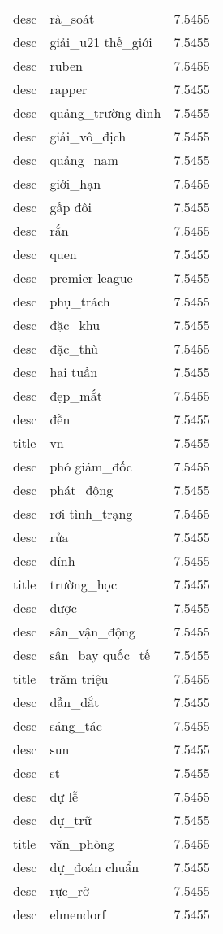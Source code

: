 \documentclass{article}
\begin{document}
\begin{tabular}{lll}
desc & rà\_soát & 7.5455\\
desc & giải\_u21 thế\_giới & 7.5455\\
desc & ruben & 7.5455\\
desc & rapper & 7.5455\\
desc & quảng\_trường đình & 7.5455\\
desc & giải\_vô\_địch & 7.5455\\
desc & quảng\_nam & 7.5455\\
desc & giới\_hạn & 7.5455\\
desc & gấp đôi & 7.5455\\
desc & rắn & 7.5455\\
desc & quen & 7.5455\\
desc & premier league & 7.5455\\
desc & phụ\_trách & 7.5455\\
desc & đặc\_khu & 7.5455\\
desc & đặc\_thù & 7.5455\\
desc & hai tuần & 7.5455\\
desc & đẹp\_mắt & 7.5455\\
desc & đền & 7.5455\\
title & vn & 7.5455\\
desc & phó giám\_đốc & 7.5455\\
desc & phát\_động & 7.5455\\
desc & rơi tình\_trạng & 7.5455\\
desc & rửa & 7.5455\\
desc & dính & 7.5455\\
title & trường\_học & 7.5455\\
desc & dược & 7.5455\\
desc & sân\_vận\_động & 7.5455\\
desc & sân\_bay quốc\_tế & 7.5455\\
title & trăm triệu & 7.5455\\
desc & dẫn\_dắt & 7.5455\\
desc & sáng\_tác & 7.5455\\
desc & sun & 7.5455\\
desc & st & 7.5455\\
desc & dự lễ & 7.5455\\
desc & dự\_trữ & 7.5455\\
title & văn\_phòng & 7.5455\\
desc & dự\_đoán chuẩn & 7.5455\\
desc & rực\_rỡ & 7.5455\\
desc & elmendorf & 7.5455\\

\end{tabular}
\end{document}
